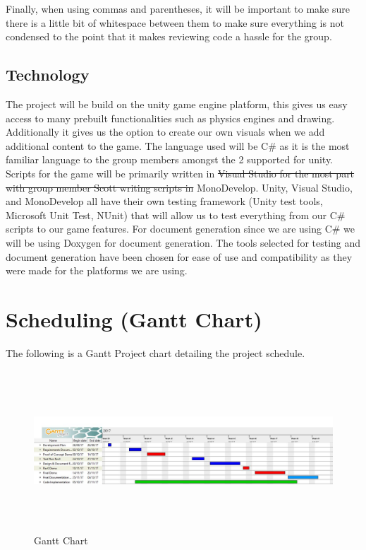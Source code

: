 \documentclass[12pt]{article}
\begin{document}
	Finally, when using commas and parentheses, it will be important to make sure there is a little bit of whitespace between them to make sure everything is not condensed to the point that it makes reviewing code a hassle for the group. 


\subsection{Technology}
The project will be build on the unity game engine platform, this gives us easy access to many prebuilt functionalities such as physics engines and drawing. Additionally it gives us the option to create our own visuals when we add additional content to the game. The language used will be C\# as it is the most familiar language to the group members amongst the 2 supported for unity. Scripts for the game will be {\color{blue}primarily} written in \sout{Visual Studio for the most part with group member Scott writing scripts in} MonoDevelop. Unity, Visual Studio, and MonoDevelop all have their own testing framework (Unity test tools, Microsoft Unit Test, NUnit) that will allow us to test everything from our C\# scripts to our game features. For document generation since we are using C\# we will be using Doxygen for document generation. The tools selected for testing and document generation have been chosen for ease of use and compatibility as they were made for the platforms we are using. 

\newpage

\section{Scheduling (Gantt Chart)}
The following is a Gantt Project chart detailing the project schedule.
\begin{figure}[h!]
\centering
\includegraphics[width = 14cm, height = 6cm]{GanttChart}
\caption{Gantt Chart}
\end{figure}
\end{document}
